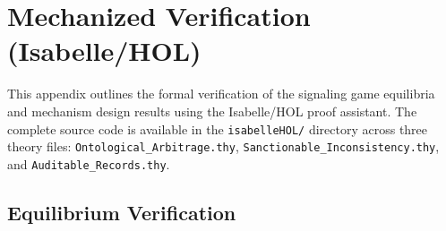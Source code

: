 \documentclass[review,authoryear]{elsarticle}
\theoremstyle{definition}
\theoremstyle{plain}
\begin{document}
\appendix


\section{Mechanized Verification (Isabelle/HOL)}
\label{app:isabelle}

This appendix outlines the formal verification of the signaling game equilibria and mechanism design results using the Isabelle/HOL proof assistant. The complete source code is available in the \texttt{isabelleHOL/} directory across three theory files: \texttt{Ontological\_\allowbreak{}Arbitrage.thy}, \texttt{Sanctionable\_\allowbreak{}Inconsistency.thy}, and \texttt{Auditable\_\allowbreak{}Records.thy}.

\subsection*{Equilibrium Verification}
\end{document}

